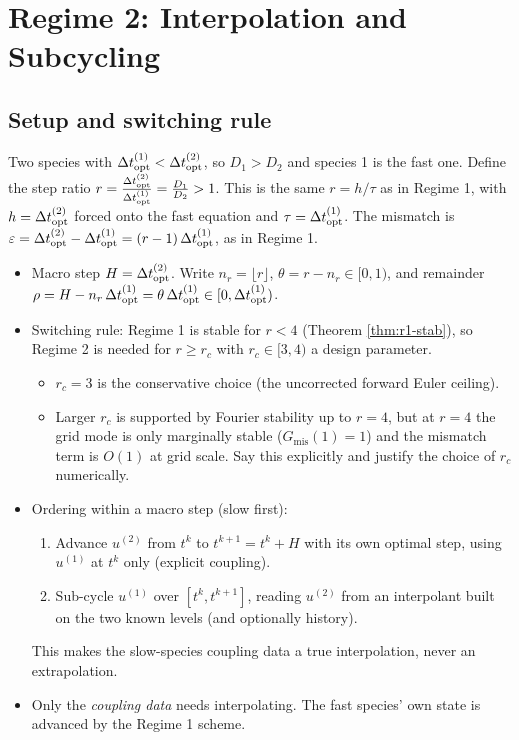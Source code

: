 \section{Regime 2: Interpolation and Subcycling}\label{sec:regime2}

\subsection{Setup and switching rule}

Two species with $\Delta t_{\mathrm{opt}}^{(1)} < \Delta t_{\mathrm{opt}}^{(2)}$, so $D_1 > D_2$ and species 1 is the fast one. Define the step ratio $r = \frac{\Delta t_{\mathrm{opt}}^{(2)}}{\Delta t_{\mathrm{opt}}^{(1)}} = \frac{D_1}{D_2} > 1$. This is the same $r = h/\tau$ as in Regime 1, with $h = \Delta t_{\mathrm{opt}}^{(2)}$ forced onto the fast equation and $\tau = \Delta t_{\mathrm{opt}}^{(1)}$. The mismatch is $\varepsilon = \Delta t_{\mathrm{opt}}^{(2)} - \Delta t_{\mathrm{opt}}^{(1)} = (r-1)\,\Delta t_{\mathrm{opt}}^{(1)}$, as in Regime 1.

\begin{itemize} 
  \item Macro step $H = \Delta t_{\mathrm{opt}}^{(2)}$. Write $n_r = \lfloor r \rfloor$, $\theta = r - n_r \in [0,1)$, and remainder $\rho = H - n_r\,\Delta t_{\mathrm{opt}}^{(1)} = \theta\,\Delta t_{\mathrm{opt}}^{(1)} \in [0,\Delta t_{\mathrm{opt}}^{(1)})$.
  \item Switching rule: Regime 1 is stable for $r < 4$ (Theorem \ref{thm:r1-stab}), so Regime 2 is needed for $r \ge r_c$ with $r_c \in [3,4)$ a design parameter.
  \begin{itemize}
    \item $r_c = 3$ is the conservative choice (the uncorrected forward Euler ceiling).
    \item Larger $r_c$ is supported by Fourier stability up to $r = 4$, but at $r = 4$ the grid mode is only marginally stable ($G_{\mathrm{mis}}(1) = 1$) and the mismatch term is $O(1)$ at grid scale. Say this explicitly and justify the choice of $r_c$ numerically.
  \end{itemize}
  \item Ordering within a macro step (slow first):
  \begin{enumerate}
    \item Advance $u^{(2)}$ from $t^k$ to $t^{k+1} = t^k + H$ with its own optimal step, using $u^{(1)}$ at $t^k$ only (explicit coupling).
    \item Sub-cycle $u^{(1)}$ over $[t^k, t^{k+1}]$, reading $u^{(2)}$ from an interpolant built on the two known levels (and optionally history).
  \end{enumerate}
  This makes the slow-species coupling data a true interpolation, never an extrapolation.
  \item Only the \emph{coupling data} needs interpolating. The fast species' own state is advanced by the Regime 1 scheme.
\end{itemize}

